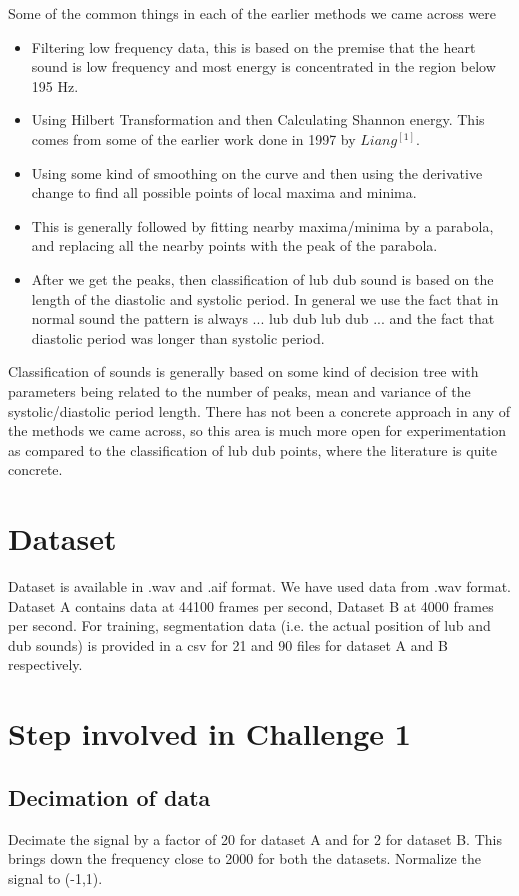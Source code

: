 \documentclass{article}
\begin{document}
Some of the common things in each of the earlier methods we came across were
\begin{itemize}
\item  Filtering low frequency data, this is based on the premise that the heart sound is low frequency and most energy is concentrated in the region below 195 Hz.
\item  Using Hilbert Transformation and then Calculating Shannon energy. This comes from some of the earlier work done in 1997 by $Liang^{[1]}$.
\item Using some kind of smoothing on the curve and then using the derivative change to find all possible points of local maxima and minima.
\item This is generally followed by fitting nearby maxima/minima by a parabola, and replacing all the nearby points with the peak of the parabola.
\item After we get the peaks, then classification of lub dub sound is based on the length of the diastolic and systolic period. In general we use the fact that in normal sound the pattern is always ... lub dub lub dub ... and the fact that diastolic period was longer than systolic period.
\end{itemize}
Classification of sounds is generally based on some kind of decision tree with parameters being related to the number of peaks, mean and variance of the systolic/diastolic period length. There has not been a concrete approach in any of the methods we came across, so this area is much more open for experimentation as compared to the classification of lub dub points, where the literature is quite concrete.

\section{Dataset}
Dataset is available in .wav and .aif format. We have used data from .wav format. Dataset A contains data at 44100 frames per second, Dataset B at 4000 frames per second. For training, segmentation data (i.e. the actual position of lub and dub sounds) is provided in a csv for 21 and 90 files for dataset A and B respectively.\\
\graphicspath{ {Images/} }

\section{Step involved in Challenge 1}

\subsection{Decimation of data}
Decimate the signal by a factor of 20 for dataset A and for 2 for dataset B. This brings down the frequency close to 2000 for both the datasets. Normalize the signal to (-1,1).\\
\end{document}
